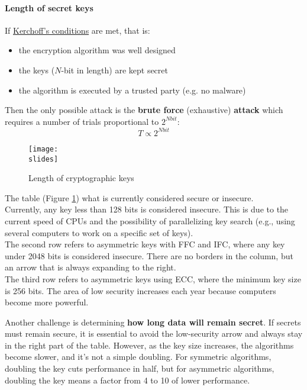 \paragraph{Length of secret keys}
If \ul{Kerchoff's conditions} are met, that is:
\begin{itemize}
    \item the encryption algorithm was well designed
    \item the keys ($N$-bit in length) are kept secret
    \item the algorithm is executed by a trusted party (e.g. no malware)
\end{itemize}
Then the only possible attack is the \textbf{brute force} (exhaustive) \textbf{attack} which requires a number of trials proportional to $2^{N bit}$:
\[
    T \propto 2^{N bit}
\]


\begin{figure}[h]
    \centering
    \texttt{[image: \\slides]}
    \caption{Length of cryptographic keys}
    \label{fig:cryptolength}
\end{figure}

The table (Figure \ref{fig:cryptolength}) what is currently considered secure or insecure.\\
Currently, any key less than 128 bits is considered insecure.
This is due to the current speed of CPUs and the possibility of parallelizing key search (e.g., using several computers to work on a specific set of keys).\\
The second row refers to asymmetric keys with FFC and IFC, where any key under 2048 bits is considered insecure.
There are no borders in the column, but an arrow that is always expanding to the right. \\
The third row refers to asymmetric keys using ECC, where the minimum key size is 256 bits.
The area of low security increases each year because computers become more powerful.

Another challenge is determining \textbf{how long data will remain secret}.
If secrets must remain secure, it is essential to avoid the low-security arrow and always stay in the right part of the table.
However, as the key size increases, the algorithms become slower, and it's not a simple doubling.
For symmetric algorithms, doubling the key cuts performance in half, but for asymmetric algorithms, doubling the key means a factor from 4 to 10 of lower performance.


